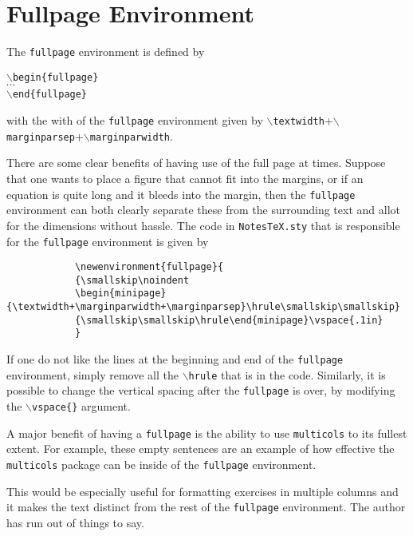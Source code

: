 \documentclass[10pt]{article}
\begin{document}
	\section{Fullpage Environment}\label{Sec: Fullpage}
	\begin{fullpage}
		The \texttt{fullpage} environment is defined by
		\begin{center}
			\texttt{$\backslash$begin\{fullpage\}}\\
			$\cdots$\\
			\texttt{$\backslash$end\{fullpage\}}
		\end{center}
		with the with of the \texttt{fullpage} environment given by \texttt{$\backslash$textwidth}+\texttt{$\backslash$marginparsep}+\texttt{$\backslash$marginparwidth}.\\
	\end{fullpage}
	There are some clear benefits of having use of the full page at times. Suppose that one wants to place a figure that cannot fit into the margins, or if an equation is quite long and it bleeds into the margin, then the \texttt{fullpage} environment can both clearly separate these from the surrounding text and allot for the dimensions without hassle. The code in \texttt{NotesTeX.sty} that is responsible for the \texttt{fullpage} environment is given by\\

	\begin{fullpage}
			\begin{verbatim}
			\newenvironment{fullpage}{
			{\smallskip\noindent
			\begin{minipage}{\textwidth+\marginparwidth+\marginparsep}\hrule\smallskip\smallskip}
			{\smallskip\smallskip\hrule\end{minipage}\vspace{.1in}
			}
			\end{verbatim}
	\end{fullpage}
	
	\begin{remark}
		If one do not like the lines at the beginning and end of the \texttt{fullpage} environment, simply remove all the \texttt{$\backslash$hrule} that is in the code. Similarly, it is possible to change the vertical spacing after the \texttt{fullpage} is over, by modifying the \texttt{$\backslash$vspace\{\}} argument. 
	\end{remark}
	
	\begin{fullpage}
		\begin{multicols}{2}
		A major benefit of having a \texttt{fullpage} is the ability to use \texttt{multicols} to its fullest extent. For example, these empty sentences are an example of how effective the \texttt{multicols} package can be inside of the \texttt{fullpage} environment. 

		This would be especially useful for formatting exercises in multiple columns and it makes the text distinct from the rest of the \texttt{fullpage} environment. The author has run out of things to say.
		\end{multicols}
	\end{fullpage}
\end{document}
